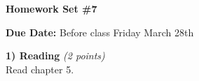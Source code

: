 

\def\xyprime{\ensuremath{\begin{pmatrix} x' \\ y' \end{pmatrix}}}



\thispagestyle{fancy}






\begin{center}
{\huge \textbf{Homework Set \#7}}
\large

{\textbf{ Due Date:} Before class Friday March 28th  }
\end{center}

\textbf{1) Reading } \hfill \textit{(2 points)}\\
Read chapter 5.


